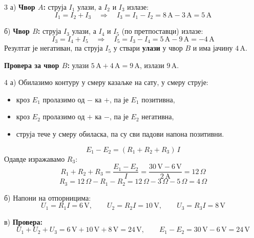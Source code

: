 \documentclass[12pt]{article}
\begin{document}
\begin{resenje}{3}
а) \textbf{Чвор $A$:} струја $I_1$ улази, а $I_2$ и $I_3$ излазе:
\[
I_1 = I_2 + I_3
\quad\Longrightarrow\quad
I_3 = I_1 - I_2 = 8\,\text{A} - 3\,\text{A} = 5\,\text{A}
\]

б) \textbf{Чвор $B$:} струја $I_3$ улази, а $I_4$ и $I_5$ (по претпоставци)
излазе:
\[
I_3 = I_4 + I_5
\quad\Longrightarrow\quad
I_5 = I_3 - I_4 = 5\,\text{A} - 9\,\text{A} = -4\,\text{A}
\]
Резултат је негативан, па струја $I_5$ у ствари \textbf{улази} у чвор $B$ и
има јачину $4\,\text{A}$.

\textbf{Провера за чвор $B$:} улази $5\,\text{A} + 4\,\text{A} = 9\,\text{A}$,
излази $9\,\text{A}$.
\end{resenje}

\begin{resenje}{4}
а) Обилазимо контуру у смеру казаљке на сату, у смеру струје:
\begin{itemize}
    \item кроз $E_1$ пролазимо од $-$ ка $+$, па је $E_1$ позитивна,
    \item кроз $E_2$ пролазимо од $+$ ка $-$, па је $E_2$ негативна,
    \item струја тече у смеру обиласка, па су сви падови напона позитивни.
\end{itemize}
\[
E_1 - E_2 = (R_1 + R_2 + R_3)\, I
\]
Одавде изражавамо $R_3$:
\[
R_1 + R_2 + R_3 = \frac{E_1 - E_2}{I} = \frac{30\,\text{V} - 6\,\text{V}}{2\,\text{A}}
= 12\,\Omega
\]
\[
R_3 = 12\,\Omega - R_1 - R_2 = 12\,\Omega - 3\,\Omega - 5\,\Omega = 4\,\Omega
\]

б) Напони на отпорницима:
\[
U_1 = R_1 I = 6\,\text{V}, \qquad
U_2 = R_2 I = 10\,\text{V}, \qquad
U_3 = R_3 I = 8\,\text{V}
\]

в) \textbf{Провера:}
\[
U_1 + U_2 + U_3 = 6\,\text{V} + 10\,\text{V} + 8\,\text{V} = 24\,\text{V},
\qquad
E_1 - E_2 = 30\,\text{V} - 6\,\text{V} = 24\,\text{V}
\]
\end{resenje}
\end{document}
